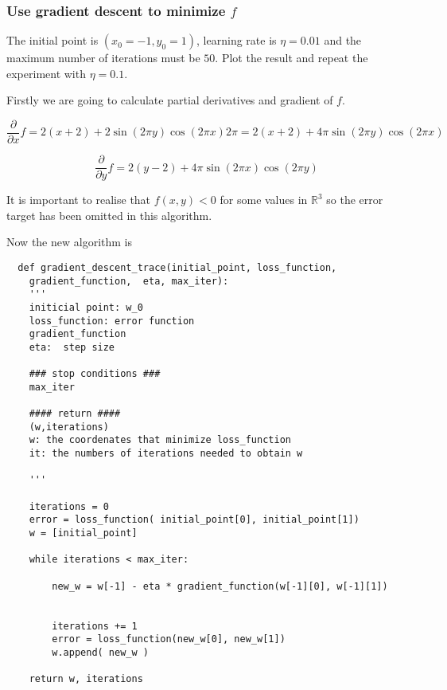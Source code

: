 \subsubsection{ Use gradient descent to minimize $f$}

The initial point is $(x_0 = -1, y_0 = 1)$,
learning rate is $\eta = 0.01$ and the maximum number of iterations must
be $50$.  Plot the result and repeat the experiment with  $\eta = 0.1$. 

Firstly we are going to calculate partial derivatives and gradient of $f$.

\begin{equation*}
  \frac{\partial }{\partial x} f = 2 (x + 2) + 2 \sin (2 \pi y) \cos ( 2 \pi x) 2 \pi =  2 (x + 2) +  4 \pi \sin (2 \pi y) \cos ( 2 \pi x)   
\end{equation*}

\begin{equation*}
  \frac{\partial }{\partial y} f = 2 (y - 2) +  4 \pi \sin (2 \pi x) \cos ( 2 \pi y)   
\end{equation*}


It is important to realise that $f(x,y) <0$ for some values in $\mathbb R^3$ so the error target has been omitted in this algorithm.   


Now the new algorithm is
\begin{verbatim}
  def gradient_descent_trace(initial_point, loss_function,
    gradient_function,  eta, max_iter):
    '''
    initicial point: w_0 
    loss_function: error function 
    gradient_function
    eta:  step size 

    ### stop conditions ###
    max_iter

    #### return ####
    (w,iterations)
    w: the coordenates that minimize loss_function
    it: the numbers of iterations needed to obtain w
    
    '''

    iterations = 0
    error = loss_function( initial_point[0], initial_point[1])
    w = [initial_point]
  
    while iterations < max_iter: 

        new_w = w[-1] - eta * gradient_function(w[-1][0], w[-1][1])
        
        
        iterations += 1
        error = loss_function(new_w[0], new_w[1])
        w.append( new_w ) 
    
    return w, iterations
  
  \end{verbatim}


